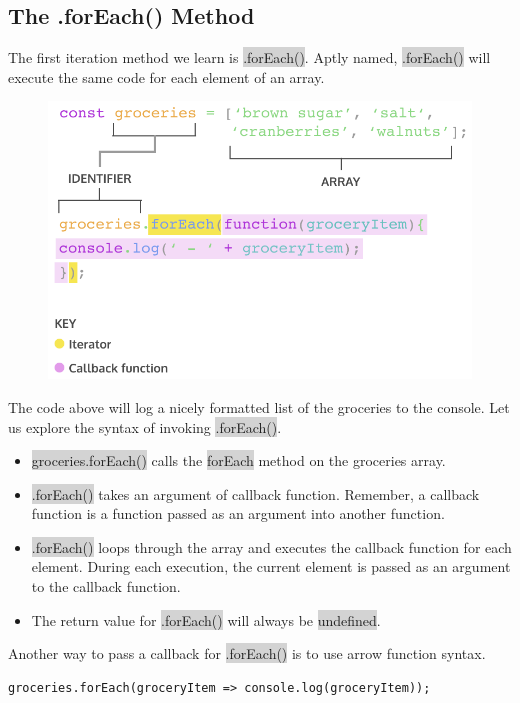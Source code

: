 \documentclass[11pt]{article}
\begin{document}
\subsection{The .forEach() Method}
The first iteration method we learn is \colorbox{lightgray}{.forEach()}. Aptly named, \colorbox{lightgray}{.forEach()} will execute the same code for each element of an array.
\begin{figure}[H]
\includegraphics[scale = 0.7]{9_1}
\centering
\end{figure}
The code above will log a nicely formatted list of the groceries to the console. Let us explore the syntax of invoking \colorbox{lightgray}{.forEach()}.
\begin{itemize}[leftmargin = *]
\item \colorbox{lightgray}{groceries.forEach()} calls the \colorbox{lightgray}{forEach} method on the groceries array.
\item \colorbox{lightgray}{.forEach()} takes an argument of callback function. Remember, a callback function is a function passed as an argument into another function.
\item \colorbox{lightgray}{.forEach()} loops through the array and executes the callback function for each element. During each execution, the current element is passed as an argument to the callback function.
\item The return value for \colorbox{lightgray}{.forEach()} will always be \colorbox{lightgray}{undefined}.
\end{itemize}
Another way to pass a callback for \colorbox{lightgray}{.forEach()} is to use arrow function syntax.
\begin{lstlisting}
groceries.forEach(groceryItem => console.log(groceryItem));
\end{lstlisting}
\end{document}
